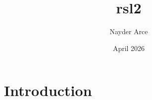 \documentclass{article}
\title{rsl2}
\author{Nayder Arce}
\date{April 2026}
\begin{document}
\maketitle

\section{Introduction}\href{}{}
\end{document}
